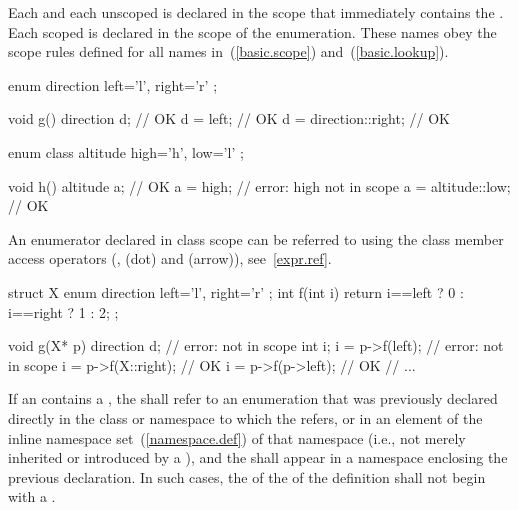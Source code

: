\pnum
{}%
Each  and each unscoped  is
declared in the scope that immediately contains the .
Each scoped  is declared in the scope of the
enumeration.
These names obey the scope rules defined for all names
in~(\ref{basic.scope}) and~(\ref{basic.lookup}).\begin{example}

\begin{codeblock}
enum direction { left='l', right='r' }; 

void g()  { 
  direction d;                  // OK 
  d = left;                     // OK 
  d = direction::right;         // OK 
} 

enum class altitude { high='h', low='l' }; 

void h()  { 
  altitude a;                   // OK 
  a = high;                     // error: high not in scope 
  a = altitude::low;            // OK 
}
\end{codeblock}
\end{example}
%
An enumerator declared in class scope can be referred to using the class
member access operators (\tcode{::},  (dot) and \tcode{->}
(arrow)), see~\ref{expr.ref}.
\begin{example}

\begin{codeblock}
struct X {
  enum direction { left='l', right='r' };
  int f(int i) { return i==left ? 0 : i==right ? 1 : 2; }
};

void g(X* p) {
  direction d;                  // error:  not in scope
  int i;
  i = p->f(left);               // error:  not in scope
  i = p->f(X::right);           // OK
  i = p->f(p->left);            // OK
  // ...
}
\end{codeblock}
\end{example}

\pnum
If an  contains a ,
the  shall refer to an enumeration
that was previously declared directly in the class or namespace
to which the  refers, or
in an element of the inline namespace set~(\ref{namespace.def})
of that namespace (i.e., not merely inherited or introduced by a
), and
the  shall appear in
a namespace enclosing the previous declaration.
In such cases, the 
of the  of the definition
shall not begin with a .

